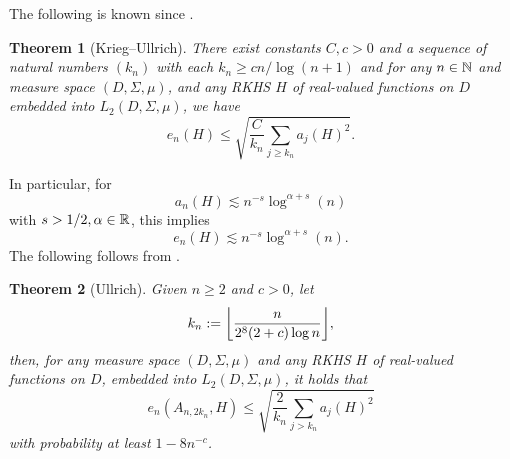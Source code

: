 \documentclass[12pt, oneside]{amsart}
\newtheorem{thm}{Theorem}[section]
\theoremstyle{definition}
\theoremstyle{remark}
\numberwithin{equation}{section}
\begin{document}
The following is known since \cite{Krieg_2020}.
\begin{thm}[Krieg--Ullrich]\label{thm:kriegUllrich2020}
	There exist constants \(C, c > 0\) and a sequence of natural numbers 
	\((k_n)\) with each \(k_n \geq cn/\log(n+1)\) and for any \(n \in \mathbb{N}\) and 
	measure space \((D, \Sigma, \mu)\), and any RKHS \(H\) of real-valued 
	functions on \(D\) embedded into \(L_2(D, \Sigma, \mu)\), we have \[
	e_n(H) \leq \sqrt{\frac{C}{k_n} \sum_{j \geq k_n} a_j(H)^2}.
	\]
\end{thm}
In particular, for 
\begin{equation}\label{eq:orderOfApproximationNumbers}
	a_n(H) \lesssim n^{-s} \log^{\alpha + s}(n)
\end{equation}
with \(s > 1/2, \alpha \in \mathbb{R}\), this implies \[
e_n(H) \lesssim n^{-s} \log^{\alpha+s}(n).
\]
The following follows from \cite{Ullrich_2020}.
\begin{thm}[Ullrich]
	Given \(n \geq 2\) and \(c > 0\), let \[
	k_n \defn \floor*{\frac{n}{2^8 (2+c) \log n}},
	\]
	then, for any measure space \((D, \Sigma, \mu)\) and any RKHS \(H\) of 
	real-valued functions on \(D\), embedded into \(L_2(D, \Sigma, \mu)\), it 
	holds that \[
	e_n\left(A_{n, 2 k_n}, H\right) \leq \sqrt{ \frac{2}{k_n} \sum_{j > k_n} 
	a_j(H)^2 }
	\]
	with probability at least \(1-8n^{-c}\).
\end{thm}
\end{document}
